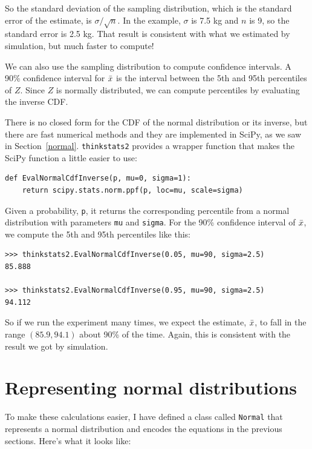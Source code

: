 \documentclass[12pt]{book}
\begin{document}
So the standard deviation of the sampling distribution, which is the
standard error of the estimate, is $\sigma / \sqrt{n}$.  In the
example, $\sigma$ is 7.5 kg and $n$ is 9, so the standard error is 2.5
kg.  That result is consistent with what we estimated by simulation,
but much faster to compute!

We can also use the sampling distribution to compute confidence
intervals.  A 90\% confidence interval for $\bar{x}$ is the interval
between the 5th and 95th percentiles of $Z$.  Since $Z$ is normally
distributed, we can compute percentiles by evaluating the inverse
CDF.

There is no closed form for the CDF of the normal distribution
or its inverse, but there are fast numerical methods and they
are implemented in SciPy, as we saw in Section~\ref{normal}.
{\tt thinkstats2} provides a wrapper function that makes the
SciPy function a little easier to use:

\begin{verbatim}
def EvalNormalCdfInverse(p, mu=0, sigma=1):
    return scipy.stats.norm.ppf(p, loc=mu, scale=sigma)
\end{verbatim}

Given a probability, {\tt p}, it returns the corresponding
percentile from a normal distribution with parameters {\tt mu}
and {\tt sigma}.  For the 90\% confidence interval of $\bar{x}$,
we compute the 5th and 95th percentiles like this:

\begin{verbatim}
>>> thinkstats2.EvalNormalCdfInverse(0.05, mu=90, sigma=2.5)
85.888

>>> thinkstats2.EvalNormalCdfInverse(0.95, mu=90, sigma=2.5)
94.112
\end{verbatim}

So if we run the experiment many times, we expect the
estimate, $\bar{x}$, to fall in the range $(85.9, 94.1)$ about
90\% of the time.  Again, this is consistent with the result
we got by simulation.


\section{Representing normal distributions}

To make these calculations easier, I have defined a class called
{\tt Normal} that represents a normal distribution and encodes
the equations in the previous sections.  Here's what it looks
like:
\end{document}
